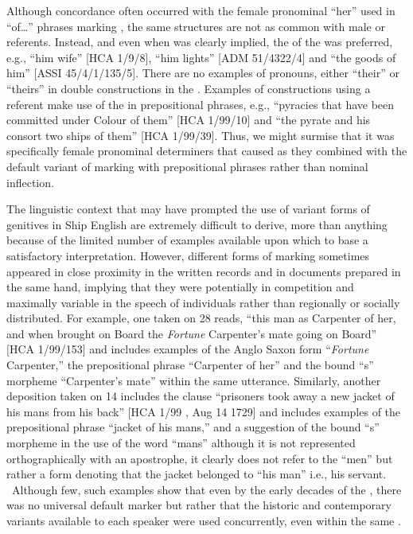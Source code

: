 Although  concordance often occurred with the  female pronominal  “her” used in “of…” phrases marking , the same structures are not as common with male or  referents. Instead, and even when  was clearly implied, the  of the  was preferred, e.g., “him wife” [HCA 1/9/8], “him lights” [ADM 51/4322/4] and “the goods of him” [ASSI 45/4/1/135/5]. There are no examples of    pronouns, either “their” or “theirs” in double  constructions in the . Examples of constructions using a   referent make use of the  in prepositional phrases, e.g., “pyracies that have been committed under Colour of them” [HCA 1/99/10] and “the pyrate and his consort two ships of them” [HCA 1/99/39]. Thus, we might surmise that it was specifically female pronominal determiners that caused  as they combined with the default variant of marking  with prepositional phrases rather than nominal inflection. 

The linguistic context that may have prompted the use of variant forms of genitives in Ship English are extremely difficult to derive, more than anything because of the limited number of examples available upon which to base a satisfactory interpretation. However, different forms of marking  sometimes appeared in close proximity in the written records and in documents prepared in the same hand, implying that they were potentially in competition and maximally variable in the speech of individuals rather than regionally or socially distributed. For example, one  taken on 28 \citealt{March1722} reads, “this man as Carpenter of her, and when brought on Board the \textit{Fortune} Carpenter’s mate going on Board” [HCA 1/99/153] and includes examples of the Anglo Saxon  form “\textit{Fortune} Carpenter,” the prepositional  phrase “Carpenter of her” and the bound “s” morpheme “Carpenter’s mate” within the same utterance. Similarly, another deposition taken on 14 \citealt{August1729} includes the clause “prisoners took away a new jacket of his mans from his back” [HCA 1/99 , Aug 14 1729] and includes examples of the prepositional  phrase “jacket of his mans,” and a suggestion of the bound “s” morpheme in the use of the word “mans” although it is not represented orthographically with an apostrophe, it clearly does not refer to the  “men” but rather a  form denoting that the jacket belonged to “his man” i.e., his servant. ~Although few, such examples show that even by the early decades of the , there was no universal default  marker but rather that the historic and contemporary variants available to each speaker were used concurrently, even within the same . 

